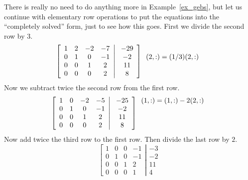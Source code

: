 \begin{example} 
\label{ex_rref}
There is really no need to do anything more in
Example~\ref{ex_gebs}, but let us  continue with elementary
row operations to put the equations into the ``completely solved'' form,
just to see how this goes. {\rm First we divide the second row by $3$.
\[
\left[
\begin{array}{cccc}
1&2&-2&-7 \\
0&1&0&-1 \\
0&0&1&2 \\
0&0&0&2
\end{array} \right| \left.
\begin{array}{c}
-29 \\ -2 \\ 11 \\ 8 
\end{array}
\right]
\begin{array}{c} 
 \\(2,:)=(1/3)(2,:) \\ \\ \hfill
\end{array}
\]
Now we subtract twice the second row from the first row.
\[
\left[
\begin{array}{cccc}
1&0&-2&-5 \\
0&1&0&-1 \\
0&0&1&2 \\
0&0&0&2
\end{array} \right| \left.
\begin{array}{c}
-25 \\ -2 \\ 11 \\ 8 
\end{array}
\right]
\begin{array}{c} 
(1,:)=(1,:)-2(2,:) \\ \\ \\ \hfill
\end{array}
\]
Now add twice the third row to the first row. Then divide the last row
by $2$.
\[
\left[
\begin{array}{cccc}
1&0&0&-1 \\
0&1&0&-1 \\
0&0&1&2 \\
0&0&0&1
\end{array} \right| \left.
\begin{array}{c}
-3 \\ -2 \\ 11 \\ 4 

\end{array}\]}
\end{example}
